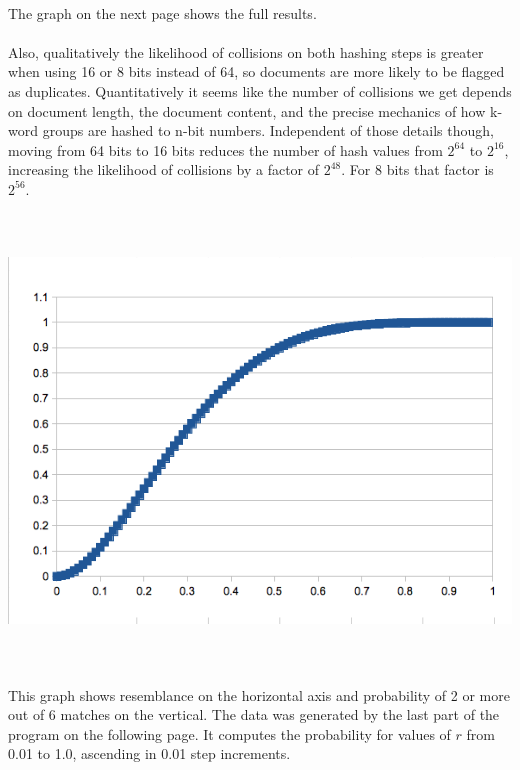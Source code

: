 \documentclass[11pt]{article}
\begin{document}
\\
The graph on the next page shows the full results. \\
\\
Also, qualitatively the likelihood of collisions on both hashing steps is greater when using 16 or 8 bits instead of 64, so documents are more likely to be flagged as duplicates. Quantitatively it seems like the number of collisions we get depends on document length, the document content, and the precise mechanics of how k-word groups are hashed to n-bit numbers. Independent of those details though, moving from 64 bits to 16 bits reduces the number of hash values from $2^{64}$ to $2^{16}$, increasing the likelihood of collisions by a factor of $2^{48}$. For 8 bits that factor is $2^{56}$.

\newpage
\includegraphics[width=150mm,height=120mm]{super-sketch.png}

This graph shows resemblance on the horizontal axis and probability of 2 or more out of 6 matches on the vertical. The data was generated by the last part of the program on the following page. It computes the probability for values of $r$ from 0.01 to 1.0, ascending in 0.01 step increments.

\newpage
\end{document}
